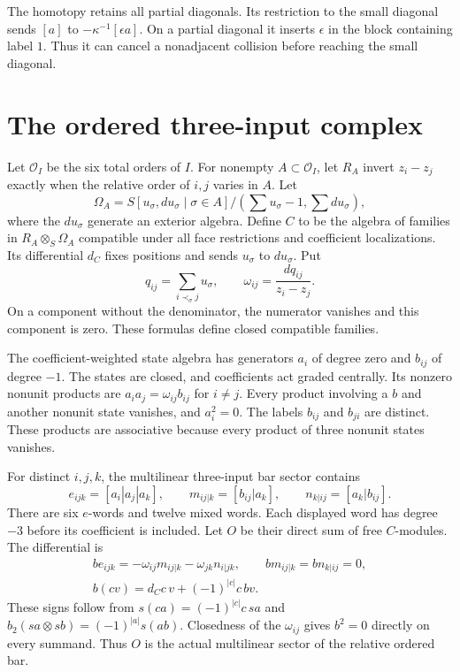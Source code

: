 The homotopy retains all partial diagonals.
Its restriction to the small diagonal sends $[a]$ to $-\kappa^{-1}[\epsilon a]$.
On a partial diagonal it inserts $\epsilon$ in the block containing label $1$.
Thus it can cancel a nonadjacent collision before reaching the small diagonal.

\section{The ordered three-input complex}

Let $\mathcal O_I$ be the six total orders of $I$.
For nonempty $A\subset\mathcal O_I$, let $R_A$ invert $z_i-z_j$ exactly when the relative order of $i,j$ varies in $A$.
Let
\[
 \Omega_A=S[u_\sigma,du_\sigma\mid\sigma\in A]
 /(\textstyle\sum u_\sigma-1,\sum du_\sigma),
\]
where the $du_\sigma$ generate an exterior algebra.
Define $C$ to be the algebra of families in $R_A\otimes_S\Omega_A$ compatible under all face restrictions and coefficient localizations.
Its differential $d_C$ fixes positions and sends $u_\sigma$ to $du_\sigma$.
Put
\[
 q_{ij}=\sum_{i\prec_\sigma j}u_\sigma,
 \qquad \omega_{ij}=\frac{dq_{ij}}{z_i-z_j}.
\]
On a component without the denominator, the numerator vanishes and this component is zero.
These formulas define closed compatible families.

The coefficient-weighted state algebra has generators $a_i$ of degree zero and $b_{ij}$ of degree $-1$.
The states are closed, and coefficients act graded centrally.
Its nonzero nonunit products are $a_i a_j=\omega_{ij}b_{ij}$ for $i\ne j$.
Every product involving a $b$ and another nonunit state vanishes, and $a_i^2=0$.
The labels $b_{ij}$ and $b_{ji}$ are distinct.
These products are associative because every product of three nonunit states vanishes.

For distinct $i,j,k$, the multilinear three-input bar sector contains
\[
 e_{ijk}=[a_i|a_j|a_k],\qquad
 m_{ij|k}=[b_{ij}|a_k],\qquad
 n_{k|ij}=[a_k|b_{ij}].
\]
There are six $e$-words and twelve mixed words.
Each displayed word has degree $-3$ before its coefficient is included.
Let $O$ be their direct sum of free $C$-modules.
The differential is
\begin{equation}\label{eq:bd26-source}
 \begin{gathered}
 be_{ijk}=-\omega_{ij}m_{ij|k}-\omega_{jk}n_{i|jk},
 \qquad bm_{ij|k}=bn_{k|ij}=0,\\
 b(cv)=d_Cc\,v+(-1)^{|c|}c\,bv.
 \end{gathered}
\end{equation}
These signs follow from $s(ca)=(-1)^{|c|}c\,sa$ and
$b_2(sa\otimes sb)=(-1)^{|a|}s(ab)$.
Closedness of the $\omega_{ij}$ gives $b^2=0$ directly on every summand.
Thus $O$ is the actual multilinear sector of the relative ordered bar.

